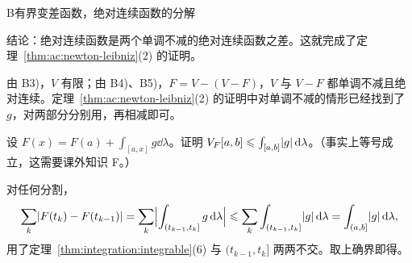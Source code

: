 \begin{probleme}{B}{有界变差函数，绝对连续函数的分解}
\begin{questions}
\begin{solution}
\end{solution}
\item 结论：绝对连续函数是两个单调不减的绝对连续函数之差。这就完成了定理~\ref{thm:ac:newton-leibniz}(2) 的证明。
\begin{solution}
由 B3)，$V$ 有限；由 B4)、B5)，$F=V-(V-F)$，$V$ 与 $V-F$ 都单调不减且绝对连续。定理~\ref{thm:ac:newton-leibniz}(2) 的证明中对单调不减的情形已经找到了 $g$，对两部分分别用，再相减即可。
\end{solution}
\item 设 $F(x)=F(a)+\int_{[a,x]}g\dd\lambda$。证明 $V_F[a,b]\leqslant\int_{[a,b]}\lvert g\rvert\,\mathrm{d}\lambda$。（事实上等号成立，这需要课外知识 F。）
\begin{solution}
对任何分割，
\[
\sum_k\lvert F(t_k)-F(t_{k-1})\rvert=\sum_k\Bigl|\int_{(t_{k-1},t_k]}g\,\mathrm{d}\lambda\Bigr|\leqslant\sum_k\int_{(t_{k-1},t_k]}\lvert g\rvert\,\mathrm{d}\lambda=\int_{(a,b]}\lvert g\rvert\,\mathrm{d}\lambda,
\]
用了定理~\ref{thm:integration:integrable}(6) 与 $(t_{k-1},t_k]$ 两两不交。取上确界即得。
\end{solution}
\end{questions}
\end{probleme}


